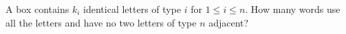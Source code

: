 A box contains $k_i$ identical letters of type $i$ for $1\le i\le n$. How many words use all the letters and have no two letters of type $n$ adjacent?
